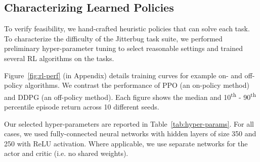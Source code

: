 \documentclass[letterpaper, 10 pt, conference]{ieeeconf}
\newcommand{\rowstyle}[1]{\gdef\currentrowstyle{#1}%
    #1\ignorespaces
}
\begin{document}
\begin{table}[t]
{
    }
    
\end{table}

\subsection{Characterizing Learned Policies}

To verify feasibility, we hand-crafted heuristic policies that can solve each task.
To characterize the difficulty of the Jitterbug task suite, we performed preliminary hyper-parameter tuning to select reasonable settings and trained several RL algorithms on the tasks.

Figure~\ref{fig:rl-perf} (in Appendix) details training curves for example on- and off-policy algorithms.
We contrast the performance of PPO (an on-policy method) and DDPG (an off-policy method).
Each figure shows the median and 10\textsuperscript{th} - 90\textsuperscript{th} percentile episode return across 10 different seeds.

Our selected hyper-parameters are reported in Table~\ref{tab:hyper-params}.
For all cases, we used fully-connected neural networks with hidden layers of size 350 and 250 with ReLU activation.
Where applicable, we use separate networks for the actor and critic (i.e. no shared weights).
\end{document}

